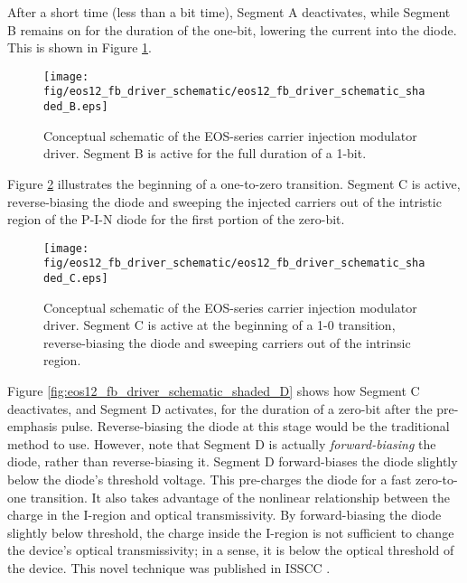 After a short time (less than a bit time), Segment A deactivates, while Segment B remains on for the duration of the one-bit, lowering the current into the diode.  This is shown in Figure \ref{fig:eos12_fb_driver_schematic_shaded_B}.   

	\begin{figure}[H]
		\begin{center}
			\texttt{[image: fig/eos12\_fb\_driver\_schematic/eos12\_fb\_driver\_schematic\_shaded\_B.eps]}
			\caption{\label{fig:eos12_fb_driver_schematic_shaded_B}Conceptual schematic of the EOS-series carrier injection modulator driver. Segment B is active for the full duration of a 1-bit.}
		\end{center}
	\end{figure}

Figure \ref{fig:eos12_fb_driver_schematic_shaded_C} illustrates the beginning of a one-to-zero transition.  Segment C is active, reverse-biasing the diode and sweeping the injected carriers out of the intristic region of the P-I-N diode for the first portion of the zero-bit.

	\begin{figure}[H]
		\begin{center}
			\texttt{[image: fig/eos12\_fb\_driver\_schematic/eos12\_fb\_driver\_schematic\_shaded\_C.eps]}
			\caption{\label{fig:eos12_fb_driver_schematic_shaded_C}Conceptual schematic of the EOS-series carrier injection modulator driver. Segment C is active at the beginning of a 1-0 transition, reverse-biasing the diode and sweeping carriers out of the intrinsic region.}
		\end{center}
	\end{figure}

Figure \ref{fig:eos12_fb_driver_schematic_shaded_D} shows how Segment C deactivates, and Segment D activates, for the duration of a zero-bit after the pre-emphasis pulse.  Reverse-biasing the diode at this stage would be the traditional method to use.  However, note that Segment D is actually \emph{forward-biasing} the diode, rather than reverse-biasing it.  Segment D forward-biases the diode slightly below the diode's threshold voltage.  This pre-charges the diode for a fast zero-to-one transition.  It also takes advantage of the nonlinear relationship between the charge in the I-region and optical transmissivity.  By forward-biasing the diode slightly below threshold, the charge inside the I-region is not sufficient to change the device's optical transmissivity; in a sense, it is below the optical threshold of the device.  This novel technique was published in ISSCC \cite{moss_isscc13}.


